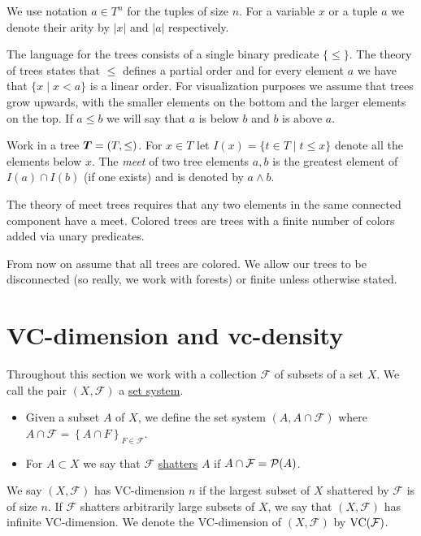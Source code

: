 \documentclass{amsart}
\DeclareMathOperator{\TT}{\boldface T}
\newcommand{\F}{\mathcal F}
\newcommand{\curly}[1]{\left\{#1\right\}}
\newcommand{\defn}{\underline}
\begin{document}
We use notation $a \in T^n$ for the tuples of size $n$. For a variable $x$ or a tuple $a$ we denote their arity by $|x|$ and $|a|$ respectively.

The language for the trees consists of a single binary predicate $\{\leq\}$. The theory of trees states that $\leq$ defines a partial order and for every element $a$ we have that $\{x \mid x < a\}$ is a linear order. For visualization purposes we assume that trees grow upwards, with the smaller elements on the bottom and the larger elements on the top. If $a \leq b$ we will say that $a$ is below $b$ and $b$ is above $a$.

\begin{Definition}
	Work in a tree $\TT = (T, \leq)$.
        For $x \in T$ let $I(x) = \{t \in T \mid t \leq x\}$ denote all the elements below $x$.
        The \emph{meet} of two tree elements $a,b$ is the greatest element of $I(a) \cap I(b)$ (if one exists) and is denoted by $a \wedge b$.
\end{Definition}

The theory of meet trees requires that any two elements in the same connected component have a meet. Colored trees are trees with a finite number of colors added via unary predicates.

From now on assume that all trees are colored.
We allow our trees to be disconnected (so really, we work with forests) or finite unless otherwise stated.


\section{VC-dimension and vc-density}


\begin{Definition}
  Throughout this section we work with a collection $\F$ of subsets of a set $X$.
  We call the pair $(X, \F)$ a \defn{set system}.
  \begin{itemize}
  \item Given a subset $A$ of $X$, we define the set system $(A, A \cap \F)$
    where $A \cap \F = \curly{A \cap F}_{F\in \F}$.
  \item For $A \subset X$ we say that $\F$ \defn{shatters} $A$ if $A \cap \F = \PP(A)$.
  \end{itemize}    
\end{Definition}  

\begin{Definition}
  We say $(X, \F)$ has VC-dimension $n$ if the largest subset of $X$ shattered by $\F$ is of size $n$.
  If $\F$ shatters arbitrarily large subsets of $X$, we say that $(X, \F)$ has infinite VC-dimension.
  We denote the VC-dimension of $(X, \F)$ by $\VC(\F)$.
\end{Definition}  
\end{document}
